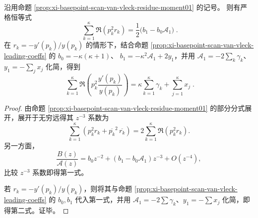 \begin{proposition}\label{prop:xi-basepoint-scan-van-vleck-residue-moment2}
沿用命题 \ref{prop:xi-basepoint-scan-van-vleck-residue-moment01} 的记号。
则有严格恒等式
\[
\boxed{\;
\sum_{k=1}^{\kappa}\Re(p_k^{2} r_k)=\frac{1}{2}\bigl(b_1-b_0\mathcal{A}_1\bigr)\; }.
\]
在 \(r_k=-y'(p_k)/y(p_k)\) 的情形下，结合命题 \ref{prop:xi-basepoint-scan-van-vleck-leading-coeffs} 的
\(
b_0=-\kappa(\kappa+1)
\)、
\(
b_1=-\kappa^{2}\mathcal{A}_1+2y_1
\)，并用 \(\mathcal{A}_1=-2\sum_{k}\gamma_k\)、\(y_1=-\sum_{j}x_j\) 化简，得到
\[
\boxed{\;
\sum_{k=1}^{\kappa}\Re\!\left(p_k^{2}\frac{y'(p_k)}{y(p_k)}\right)
=\kappa\sum_{k=1}^{\kappa}\gamma_k+\sum_{j=1}^{\kappa}x_j\; }.
\]
\end{proposition}
\begin{proof}
由命题 \ref{prop:xi-basepoint-scan-van-vleck-residue-moment01} 的部分分式展开，展开于无穷远得其 \(z^{-3}\) 系数为
\[
\sum_{k=1}^{\kappa}(p_k^2 r_k+\overline{p_k}^2\,\overline{r_k})
=2\sum_{k=1}^{\kappa}\Re(p_k^2 r_k).
\]
另一方面，
\[
\frac{B(z)}{\mathcal{A}(z)}
=b_0 z^{-2}+(b_1-b_0\mathcal{A}_1)z^{-3}+O(z^{-4}),
\]
比较 \(z^{-3}\) 系数即得第一式。
\par
若 \(r_k=-y'(p_k)/y(p_k)\)，则将其与命题 \ref{prop:xi-basepoint-scan-van-vleck-leading-coeffs} 的 \(b_0,b_1\) 代入第一式，并用 \(\mathcal{A}_1=-2\sum\gamma_k\)、\(y_1=-\sum x_j\) 化简，即得第二式。证毕。
\end{proof}

